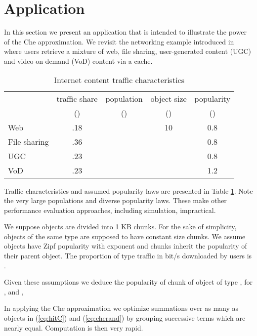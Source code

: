 \documentclass{amsart}
\begin{document}
\section{Application}
\label{sec:application}

In this section we present an application that is intended to illustrate the power of the Che approximation. We revisit the networking example introduced in \cite{FRRS12} where users retrieve a mixture of web, file sharing, user-generated content (UGC) and video-on-demand (VoD) content via a cache. 


\begin{table}[t]
\begin{center}
\begin{tabular}{l  |  c |c| c| c }
\hline
 & traffic share &  population  & object size & popularity \\
  &()  & ()&  () & ()\\
   \hline
Web   & .18 &  & 10  & 0.8 \\
File sharing  & .36 &   &   & 0.8\\
UGC  & .23 &    &   & 0.8 \\
VoD & .23 &  &   & 1.2 \\ 
\hline
\end{tabular}
\caption{ Internet content traffic characteristics}
\label{tab:characteristics}
\vspace{-3mm}
\end{center}
\end{table}

Traffic characteristics and assumed popularity laws are presented in Table \ref{tab:characteristics}. Note the very large populations and diverse popularity laws. These make other performance evaluation approaches, including simulation, impractical. 

We suppose objects are divided into 1 KB chunks. For the sake of simplicity, objects of the same type  are supposed to have constant size  chunks.  We assume objects have Zipf popularity with exponent  and chunks inherit the popularity of their parent object.  The proportion of type  traffic in bit/s downloaded by users is . 

Given these assumptions we deduce the popularity of chunk  of object  of type , for ,  and ,


In applying the Che approximation we optimize summations over as many as   objects in (\ref{eq:hitC}) and (\ref{eq:cherand}) by grouping successive terms which are nearly equal. Computation is then very rapid.
\end{document}
